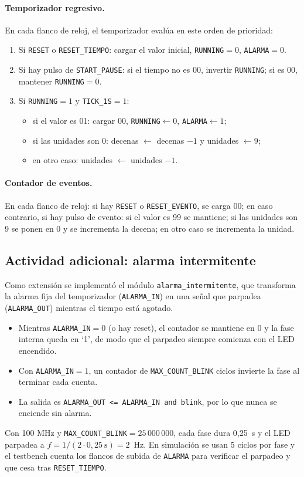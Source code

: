 \documentclass[letterpaper,12pt]{article}
\begin{document}
\paragraph{Temporizador regresivo.} En cada flanco de reloj, el temporizador evalúa en este orden de prioridad:
\begin{enumerate}
    \item Si \texttt{RESET} o \texttt{RESET\_TIEMPO}: cargar el valor inicial, \texttt{RUNNING}$=0$, \texttt{ALARMA}$=0$.
    \item Si hay pulso de \texttt{START\_PAUSE}: si el tiempo no es 00, invertir \texttt{RUNNING}; si es 00, mantener \texttt{RUNNING}$=0$.
    \item Si \texttt{RUNNING}$=1$ y \texttt{TICK\_1S}$=1$:
    \begin{itemize}
        \item si el valor es 01: cargar 00, \texttt{RUNNING}$\leftarrow0$, \texttt{ALARMA}$\leftarrow1$;
        \item si las unidades son 0: decenas $\leftarrow$ decenas $-1$ y unidades $\leftarrow9$;
        \item en otro caso: unidades $\leftarrow$ unidades $-1$.
    \end{itemize}
\end{enumerate}

\paragraph{Contador de eventos.} En cada flanco de reloj: si hay \texttt{RESET} o \texttt{RESET\_EVENTO}, se carga 00; en caso contrario, si hay pulso de evento: si el valor es 99 se mantiene; si las unidades son 9 se ponen en 0 y se incrementa la decena; en otro caso se incrementa la unidad.

\subsection{Actividad adicional: alarma intermitente}
Como extensión se implementó el módulo \texttt{alarma\_intermitente}, que transforma la alarma fija del temporizador (\texttt{ALARMA\_IN}) en una señal que parpadea (\texttt{ALARMA\_OUT}) mientras el tiempo está agotado.
\begin{itemize}
    \item Mientras \texttt{ALARMA\_IN}$=0$ (o hay reset), el contador se mantiene en 0 y la fase interna queda en `1', de modo que el parpadeo siempre comienza con el LED encendido.
    \item Con \texttt{ALARMA\_IN}$=1$, un contador de \texttt{MAX\_COUNT\_BLINK} ciclos invierte la fase al terminar cada cuenta.
    \item La salida es \texttt{ALARMA\_OUT <= ALARMA\_IN and blink}, por lo que nunca se enciende sin alarma.
\end{itemize}
Con 100 MHz y \texttt{MAX\_COUNT\_BLINK}$=25\,000\,000$, cada fase dura 0,25~s y el LED parpadea a $f = 1/(2\cdot0{,}25\ \mathrm{s}) = 2$~Hz. En simulación se usan 5 ciclos por fase y el testbench cuenta los flancos de subida de \texttt{ALARMA} para verificar el parpadeo y que cesa tras \texttt{RESET\_TIEMPO}.
\end{document}
